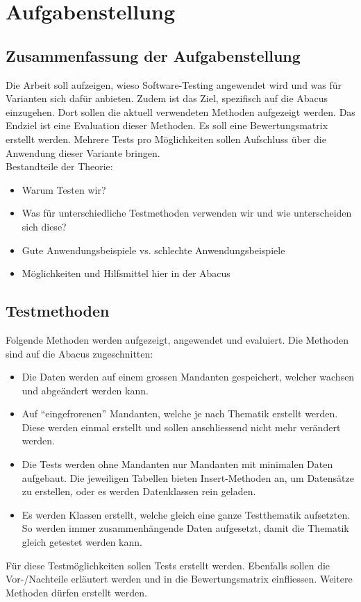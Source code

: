 \section{Aufgabenstellung} \label{Aufgabenstellung}
\subsection{Zusammenfassung der Aufgabenstellung}
Die Arbeit soll aufzeigen, wieso Software-Testing angewendet wird und was für Varianten sich dafür anbieten. Zudem ist das Ziel, spezifisch auf die Abacus einzugehen. Dort sollen die aktuell verwendeten Methoden aufgezeigt werden. Das Endziel ist eine Evaluation dieser Methoden. Es soll eine Bewertungsmatrix erstellt werden. Mehrere Tests pro Möglichkeiten sollen Aufschluss über die Anwendung dieser Variante bringen.\\
Bestandteile der Theorie:
\begin{itemize}
\item Warum Testen wir?
\item Was für unterschiedliche Testmethoden verwenden wir und wie unterscheiden sich diese?
\item Gute Anwendungsbeispiele vs. schlechte Anwendungsbeispiele
\item Möglichkeiten und Hilfsmittel hier in der Abacus
\end{itemize}

\subsection{Testmethoden} \label{Testmethoden}
Folgende Methoden werden aufgezeigt, angewendet und evaluiert. Die Methoden sind auf die Abacus zugeschnitten:
\begin{itemize}
\item Die Daten werden auf einem grossen Mandanten gespeichert, welcher wachsen und abgeändert werden kann.
\item Auf \enquote{eingefrorenen} Mandanten, welche je nach Thematik erstellt werden. Diese werden einmal erstellt und sollen anschliessend nicht mehr verändert werden.
\item Die Tests werden ohne Mandanten nur Mandanten mit minimalen Daten aufgebaut. Die jeweiligen Tabellen bieten Insert-Methoden an, um Datensätze zu erstellen, oder es werden Datenklassen rein geladen.
\item Es werden Klassen erstellt, welche gleich eine ganze Testthematik aufsetzten. So werden immer zusammenhängende Daten aufgesetzt, damit die Thematik gleich getestet werden kann.
\end{itemize}
Für diese Testmöglichkeiten sollen Tests erstellt werden. Ebenfalls sollen die Vor-/Nachteile erläutert werden und in die Bewertungsmatrix einfliessen. Weitere Methoden dürfen erstellt werden.

